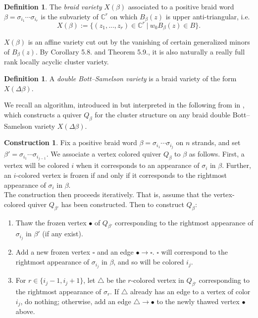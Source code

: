 \documentclass[11pt]{amsart}
\theoremstyle{definition}
\newtheorem{defn}[thm]{Definition}
\newtheorem{con}[thm]{Construction}
\theoremstyle{remark}
\numberwithin{equation}{section}
\begin{document}
\begin{defn}
    The \textit{braid variety} $X(\beta)$ associated to a positive braid word $\beta = \sigma_{i_1} \cdots \sigma_{i_r}$ is the subvariety of $\mathbb{C}^r$ on which $B_\beta(z)$ is upper anti-triangular, i.e.
    \begin{equation}
        X(\beta) := \{(z_1, ..., z_r) \in \mathbb{C}^r\:|\:w_0B_\beta(z) \in B\}.
    \end{equation}
\end{defn}

$X(\beta)$ is an affine variety cut out by the vanishing of certain generalized minors of $B_\beta(z)$. By \cite{GLSBSI} Corollary 5.8. and Theorem 5.9., it is also naturally a really full rank locally acyclic cluster variety.

\begin{defn}
    A \textit{double Bott--Samelson variety} is a braid variety of the form $X(\Delta \beta)$.
\end{defn}

We recall an algorithm, introduced in \cite{CGGLSS} but interpreted in the following from in \cite{castronovo2024cluster}, which constructs a quiver $Q_\beta$ for the cluster structure on any braid double Bott--Samelson variety $X(\Delta \beta)$.

\begin{con}\label{con:DES Construction}
    Fix a positive braid word $\beta = \sigma_{i_1}\cdots\sigma_{i_j}$ on $n$ strands, and set $\beta' = \sigma_{i_1}\cdots\sigma_{i_{j-1}}$. We associate a vertex colored quiver $Q_\beta$ to $\beta$ as follows. First, a vertex will be colored $i$ when it corresponds to an appearance of $\sigma_i$ in $\beta$. Further, an $i$-colored vertex is frozen if and only if it corresponds to the rightmost appearance of $\sigma_i$ in $\beta$.\\
    
    The construction then proceeds iteratively. That is, assume that the vertex-colored quiver $Q_{\beta'}$ has been constructed. Then to construct $Q_\beta$:

    \begin{enumerate}
        \item Thaw the frozen vertex $\bullet$ of $Q_{\beta'}$ corresponding to the rightmost appearance of $\sigma_{i_j}$ in $\beta'$ (if any exist).

        \item Add a new frozen vertex $\square$ and an edge $\bullet \rightarrow \square$. $\square$ will correspond to the rightmost appearance of $\sigma_{i_j}$ in $\beta$, and so will be colored $i_j$.

        \item For $r \in \{i_j - 1, i_j + 1\}$, let $\triangle$ be the $r$-colored vertex in $Q_{\beta'}$ corresponding to the rightmost appearance of $\sigma_r$. If $\triangle$ already has an edge to a vertex of color $i_j$, do nothing; otherwise, add an edge $\triangle \rightarrow \bullet$ to the newly thawed vertex $\bullet$ above.
    \end{enumerate}
\end{con}
\end{document}
